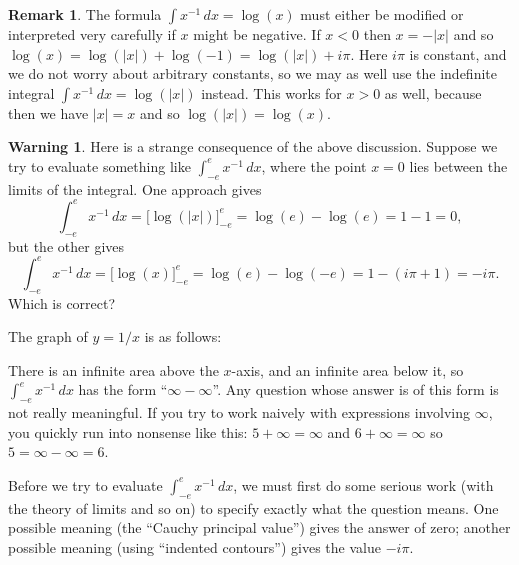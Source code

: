 \documentclass[a4paper]{book}
\renewcommand{\:}{\colon}
\theoremstyle{definition}
\newtheorem{remark}[theorem]{Remark}
\newtheorem{warning}[theorem]{Warning}
\begin{document}
\begin{remark}
 The formula $\int x^{-1}\,dx=\log(x)$ must either be modified or
 interpreted very carefully if $x$ might be negative.  If $x<0$ then
 $x=-|x|$ and so $\log(x)=\log(|x|)+\log(-1)=\log(|x|)+i\pi$.  Here
 $i\pi$ is constant, and we do not worry about arbitrary constants, so
 we may as well use the indefinite integral
 $\int x^{-1}\,dx=\log(|x|)$ instead.  This works for $x>0$ as well,
 because then we have $|x|=x$ and so $\log(|x|)=\log(x)$.
\end{remark} 
\begin{warning}
 Here is a strange consequence of the above discussion.  Suppose we
 try to evaluate something like $\int_{-e}^e x^{-1}\,dx$, where the
 point $x=0$ lies between the limits of the integral.  One approach
 gives 
 \[ \int_{-e}^{e} x^{-1}\, dx = \bigl[\log(|x|)\bigr]^{e}_{-e}
     = \log(e) - \log(e) = 1-1 = 0,
 \]
 but the other gives
 \[ \int_{-e}^{e} x^{-1}\, dx = \bigl[\log(x)\bigr]^{e}_{-e}
     = \log(e) - \log(-e) = 1-(i\pi+1) = -i\pi.
 \]
 Which is correct?

 The graph of $y=1/x$ is as follows:
 \begin{center}
 \end{center}
 There is an infinite area above the $x$-axis, and an infinite area
 below it, so $\int_{-e}^e x^{-1}\,dx$ has the form
 ``$\infty-\infty$''.  Any question whose answer is of this form is
 not really meaningful.  If you try to work naively with expressions
 involving $\infty$, you quickly run into nonsense like this:
 $5+\infty=\infty$ and $6+\infty=\infty$ so $5=\infty-\infty=6$.
 
 Before we try to evaluate $\int_{-e}^e x^{-1}\,dx$, we must first do
 some serious work (with the theory of limits and so on) to specify
 exactly what the question means.  One possible meaning (the ``Cauchy
 principal value'') gives the answer of zero; another possible meaning
 (using ``indented contours'') gives the value $-i\pi$.
\end{warning}
\end{document}
